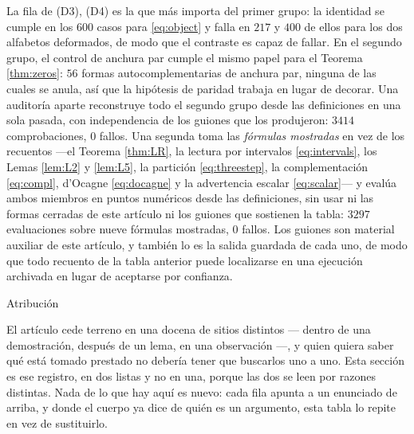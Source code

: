 \documentclass[11pt,reqno]{amsart}
\makeatletter
\renewcommand\section{\@startsection{section}{1}%
  \z@{\linespacing\@plus\linespacing}{.5\linespacing}%
  {\normalfont\large\bfseries\centering}}
\theoremstyle{plain}
\theoremstyle{definition}
\makeatother
\begin{document}
\noindent La fila de (D3), (D4) es la que más importa del primer grupo: la identidad se cumple en los
$600$ casos para \eqref{eq:object} y falla en $217$ y $400$ de ellos para los dos alfabetos
deformados, de modo que el contraste es capaz de fallar. En el segundo grupo, el control de anchura
par cumple el mismo papel para el Teorema \ref{thm:zeros}: $56$ formas autocomplementarias de anchura
par, ninguna de las cuales se anula, así que la hipótesis de paridad trabaja en lugar de decorar. Una
auditoría aparte reconstruye todo el segundo grupo desde las definiciones en una sola pasada, con
independencia de los guiones que los produjeron: $3414$ comprobaciones, $0$ fallos. Una segunda toma
las \emph{fórmulas mostradas} en vez de los recuentos ---el Teorema \ref{thm:LR}, la lectura por
intervalos \eqref{eq:intervals}, los Lemas \ref{lem:L2} y \ref{lem:L5}, la partición
\eqref{eq:threestep}, la complementación \eqref{eq:compl}, d'Ocagne \eqref{eq:docagne} y la
advertencia escalar \eqref{eq:scalar}--- y evalúa ambos miembros en puntos numéricos desde las
definiciones, sin usar ni las formas cerradas de este artículo ni los guiones que sostienen la
tabla: $3297$ evaluaciones sobre nueve fórmulas mostradas, $0$ fallos. Los guiones son
material auxiliar de este artículo, y también lo es la salida guardada de cada uno, de modo que todo
recuento de la tabla anterior puede localizarse en una ejecución archivada en lugar de aceptarse por
confianza.

\section{Atribución}\label{sec:attr}

El artículo cede terreno en una docena de sitios distintos --- dentro de una demostración, después de
un lema, en una observación ---, y quien quiera saber qué está tomado prestado no debería tener que
buscarlos uno a uno. Esta sección es ese registro, en dos listas y no en una, porque las dos se leen
por razones distintas. Nada de lo que hay aquí es nuevo: cada fila apunta a un enunciado de arriba, y
donde el cuerpo ya dice de quién es un argumento, esta tabla lo repite en vez de sustituirlo.
\end{document}
